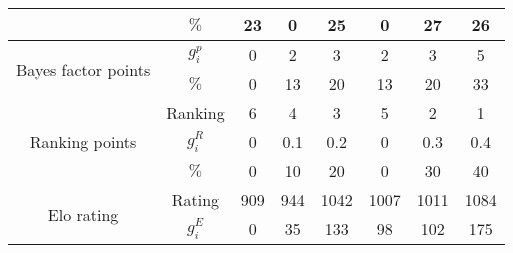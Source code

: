 \begin{tabular}{|cc|c|c|c|c|c|c|}
          & $\%$ &                                       23 &                                        0 &                                       25 &                                        0 &                                       27 &                                       26 \\
\cline{1-8}
\hline \multirow{2}{*}{Bayes factor points} & $g_i^p$ &                                        0 &                                        2 &                                        3 &                                        2 &                                        3 &                                        5 \\
          & $\%$ &                                        0 &                                       13 &                                       20 &                                       13 &                                       20 &                                       33 \\
\cline{1-8}
\hline \multirow{3}{*}{Ranking points} & Ranking &                                        6 &                                        4 &                                        3 &                                        5 &                                        2 &                                        1 \\
          & $g_i^R$ &                                        0 &                                      0.1 &                                      0.2 &                                        0 &                                      0.3 &                                      0.4 \\
          & $\%$ &                                        0 &                                       10 &                                       20 &                                        0 &                                       30 &                                       40 \\
\cline{1-8}
\hline \multirow{3}{*}{Elo rating} & Rating &                                      909 &                                      944 &                                     1042 &                                     1007 &                                     1011 &                                     1084 \\
          & $g_i^E$ &                                        0 &                                       35 &                                      133 &                                       98 &                                      102 &                                      175 \\

\end{tabular}
